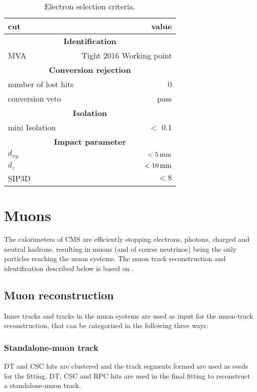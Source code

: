 \begin{table}[ht!]
\def\arraystretch{1.2}
    \caption{Electron selection criteria.}
    \label{tab:electrons}
    \begin{center}
        \begin{tabular}{ l r}
        \hline \hline
        cut &  value                             \\ \hline
        \multicolumn{2}{c}{\textbf{Identification}}                \\
        MVA &  Tight 2016 Working point    \\
        \multicolumn{2}{c}{\textbf{Conversion rejection}}                \\
        number of lost hits & 0 \\
        conversion veto & pass \\                          
        \multicolumn{2}{c}{\textbf{Isolation}}                \\
        mini Isolation  &  $<$ 0.1                         \\
        \multicolumn{2}{c}{\textbf{Impact parameter}}                \\
        $d_{xy}$ & $<5\,\text{mm}$ \\
        $d_{z}$ & $<10\,\text{mm}$ \\
        SIP3D    & $< 8$ \\
\hline\hline
\end{tabular}
\end{center}
\end{table}                                                                                       
\section{Muons}\label{sec:muons}
\noindent\justify
The calorimeters of CMS are efficiently stopping electrons, photons, charged and neutral hadrons, resulting in muons (and of course neutrinos) being the only particles reaching the muon systems.  
The muon track reconstruction and identification described below is based on \cite{Sirunyan:2018fpa}. 
\subsection*{Muon reconstruction}
\noindent\justify
Inner tracks and tracks in the muon systems are used as input for the muon-track reconstruction, that can be categorized in the following three ways:
\subsubsection*{Standalone-muon track}
\noindent\justify
DT and CSC hits are clustered and the track segments formed are used as seeds for the fitting. DT, CSC and RPC hits are used in the final fitting to reconstruct a standalone-muon track.
